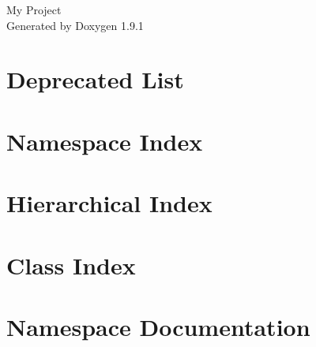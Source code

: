 \let\mypdfximage\pdfximage\def\pdfximage{\immediate\mypdfximage}\documentclass[twoside]{book}
\newcommand{\+}{\discretionary{\mbox{\scriptsize$\hookleftarrow$}}{}{}}
\newcommand{\clearemptydoublepage}{%
  \newpage{\pagestyle{empty}\cleardoublepage}%
}
\begin{document}
\raggedbottom

\hypersetup{pageanchor=false,
             bookmarksnumbered=true,
             pdfencoding=unicode
            }
\begin{titlepage}
\vspace*{7cm}
\begin{center}%
{\Large My Project }\\
\vspace*{1cm}
{\large Generated by Doxygen 1.9.1}\\
\end{center}
\end{titlepage}
\clearemptydoublepage
{}
\tableofcontents
\clearemptydoublepage
{}
\hypersetup{pageanchor=true}

\chapter{Deprecated List}
\label{deprecated}

\chapter{Namespace Index}

\chapter{Hierarchical Index}

\chapter{Class Index}

\chapter{Namespace Documentation}




\end{document}
